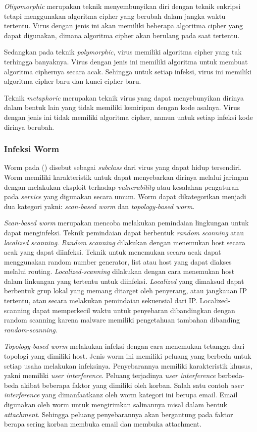 \textit{Oligomorphic} merupakan teknik menyembunyikan diri dengan teknik enkripsi tetapi menggunakan algoritma cipher yang berubah dalam jangka waktu tertentu. Virus dengan jenis ini akan memiliki beberapa algoritma cipher yang dapat digunakan, dimana algoritma cipher akan berulang pada saat tertentu.

Sedangkan pada teknik \textit{polymorphic}, virus memiliki algoritma cipher yang tak terhingga banyaknya. Virus dengan jenis ini memiliki algoritma untuk membuat algoritma ciphernya secara acak. Sehingga untuk setiap infeksi, virus ini memiliki algoritma cipher baru dan kunci cipher baru.

Teknik \textit{metaphoric} merupakan teknik virus yang dapat menyebunyikan dirinya dalam bentuk lain yang tidak memiliki kemiripan dengan kode asalnya. Virus dengan jenis ini tidak memiliki algoritma cipher, namun untuk setiap infeksi kode dirinya berubah.

\subsubsection{Infeksi Worm}

Worm pada (\cite{alsamer2016}) disebut sebagai \textit{subclass} dari virus yang dapat hidup tersendiri. Worm memiliki karakteristik untuk dapat menyebarkan dirinya melalui jaringan dengan melakukan eksploit terhadap \textit{vulnerability} atau kesalahan pengaturan pada \textit{service} yang digunakan secara umum. Worm dapat dikategorikan menjadi dua kategori yakni: \textit{scan-based worm} dan \textit{topology-based worm}.

\textit{Scan-based worm} merupakan mencoba melakukan pemindaian lingkungan untuk dapat menginfeksi. Teknik pemindaian dapat berbentuk \textit{random scanning} atau \textit{localized scanning}. \textit{Random scanning} dilakukan dengan menemukan host secara acak yang dapat diinfeksi. Teknik untuk menemukan secara acak dapat menggunakan random number generator, list atau host yang dapat diakses melalui routing. \textit{Localized-scanning} dilakukan dengan cara menemukan host dalam linkungan yang tertentu untuk diinfeksi. \textit{Localized} yang dimaksud dapat berbentuk grup lokal yang memang ditarget oleh penyerang, atau jangkauan IP tertentu, atau secara melakukan pemindaian sekuensial dari IP. Localized-scanning dapat memperkecil waktu untuk penyebaran dibandingkan dengan random scanning karena malware memiliki pengetahuan tambahan dibanding \textit{random-scanning}.

\textit{Topology-based worm} melakukan infeksi dengan cara menemukan tetangga dari topologi yang dimiliki host. Jenis worm ini memiliki peluang yang berbeda untuk setiap usaha melakukan infeksinya. Penyebarannya memiliki karakteristik khusus, yakni memiliki \textit{user interference}. Peluang terjadinya \textit{user interference} berbeda-beda akibat beberapa faktor yang dimiliki oleh korban. Salah satu contoh \textit{user interference} yang dimanfaatkanz oleh worm kategori ini berupa email. Email digunakan oleh worm untuk mengirimkan salinannya misal dalam bentuk \textit{attachment}. Sehingga peluang penyebarannya akan bergantung pada faktor berapa sering korban membuka email dan membuka attachment.

